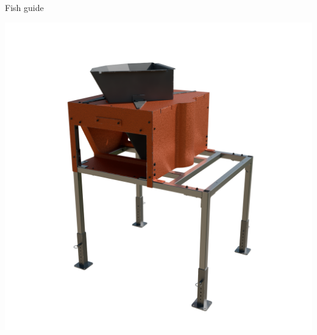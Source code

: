\documentclass[a5paper,portrait]{article}
\begin{document}
\newpage



\newpage



\newpage


\newpage

\newpage

\newpage
\centering
\vspace*{2cm}
        {\color{mainblue}\sffamily\Huge Fish guide}\\[1cm]
\begin{center}
            \includegraphics[width=1\textwidth]{../images/Chap2_Assembly.png}
\end{center}
     
\newpage

\newpage

\newpage

\newpage

\newpage

\newpage

\newpage

\newpage

\newpage

\newpage

\newpage

\newpage

\newpage

\newpage

\newpage

\newpage

\newpage

\newpage

\newpage

\newpage

\newpage

\newpage
\end{document}
